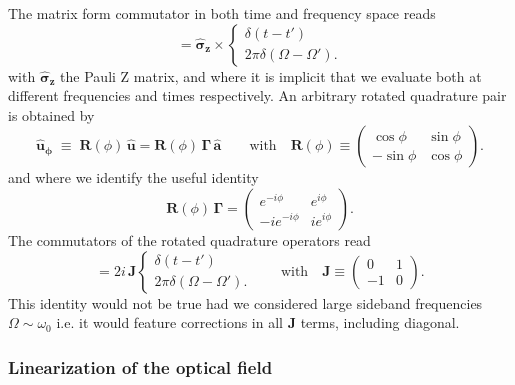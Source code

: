 The matrix form commutator in both time and frequency space reads
\begin{equation}
[\mathbf{\hat{a}}, \mathbf{\hat{a}}^{\dagger}] = \mathbf{\hat \sigma_z} \times 
\begin{cases} 
\delta (t-t')  \\
2\pi \delta (\Omega - \Omega') .
\end{cases}
\end{equation}
with $\mathbf{\hat \sigma_z}$ the Pauli Z matrix, and where it is implicit that we evaluate both at different frequencies and times respectively.  
An arbitrary rotated quadrature pair is obtained by
\begin{equation}
\mathbf{\hat{u}_\phi}\;\equiv\; \mathbf R(\phi)\,\mathbf{\hat{u}}
= \mathbf R(\phi)\,\mathbf\Gamma \,\mathbf{\hat{a}}
\qquad
\text{with} \quad
 \mathbf R(\phi)\equiv
\begin{pmatrix}
\cos\phi & \sin\phi \\
-\sin\phi & \cos\phi \label{II.4}
\end{pmatrix}.
\end{equation}
and where we identify the useful identity 
\begin{equation*}
\mathbf R(\phi)\, \mathbf \Gamma = \begin{pmatrix}
e^{-i\phi} & e^{i\phi} \\
-i e^{-i\phi} & i e^{i\phi}
\end{pmatrix}.
\end{equation*}
The commutators of the rotated quadrature operators read
\begin{equation}
[\mathbf{\hat{u}}^{\vphantom{\dagger}}_\phi , \mathbf{\hat{u}}_\phi^{\dagger}] = 2i\,\mathbf J  \begin{cases} 
\delta (t-t')  \\
2\pi \delta (\Omega - \Omega') .
\end{cases} 
\qquad \text{with} \quad
\mathbf{J} \equiv
\begin{pmatrix}
0 & 1 \\
-1 & 0
\end{pmatrix}.
\end{equation}
This identity would not be true had we considered large sideband frequencies $\Omega \sim \omega_0$ i.e. it would feature corrections in all $\mathbf{J}$ terms, including diagonal. 

\subsubsection{Linearization of the optical field}

